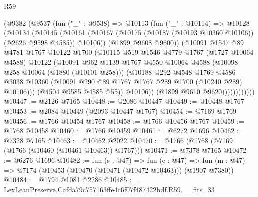 \begin{lexlean}{R59}
\begin{coremodule}
                  (@9382
                    (@9537
                      (fun ("_" : @9538) =>
                      @10113
                        (fun ("_" : @10114) =>
                        @10128
                          (@10134
                            (@10145
                              (@10161
                                (@10167
                                  (@10175 (@10187 (@10193 @10360 @10106)) (@2626 @9598 @4585))
                                  @10106))
                              (@1899 @9608 @9600))
                            (@10091
                              @1547
                              @89
                              @4781
                              @1767
                              @10122
                              @1700
                              (@10115
                                @519
                                @1546
                                @4779
                                @1767
                                (@1727 @10064 @4588)
                                @10122
                                (@10091
                                  @962
                                  @1139
                                  @1767
                                  @4550
                                  @10064
                                  @4588
                                  (@10098 @258 @10064 (@1880 (@10101 @258)))
                                  (@10188
                                    @292
                                    @4548
                                    @1769
                                    @4586
                                    @3038
                                    @10360
                                    (@10091 @290 @89 @1767 @1767 @289 @1700 (@10240 @289) @10106)))
                                (@4504 @9585 @4585 @55))
                              @10106))
                          (@1899 @9610 @9620))))))))))))
@10447 := @2126 @7165
@10448 := @2086 @10447
@10449 := @10448 @1767
@10453 := @2084 @10449 (@2093 @10447 @1767)
@10454 := @7169 @1769
@10456 := @1766 @10454 @1767
@10458 := @1766 @10456 @1767
@10459 := @1768 @10458
@10460 := @1766 @10459
@10461 := @6272 @1696
@10462 := @7328 @7165
@10463 := @10462 @2022
@10470 := @1766 (@1768 (@7169 (@1766 (@10460 (@10461 @10463)) @1767)))
@10471 := @7378 @7165
@10472 := @6276 @1696
@10482 := fun (s : @47) =>
  fun (e : @47) => fun (m : @47) => @7174 (@10453 (@10470 (@10471 (@10472 @10463))) (@1907 @7380))
@10484 := @1794 @1081 @2286
@10485 := LexLeanPreserve.Cafda79c757163ffe4c6f07f487422bdf.R59.__fits_33

\end{coremodule}
\end{lexlean}
